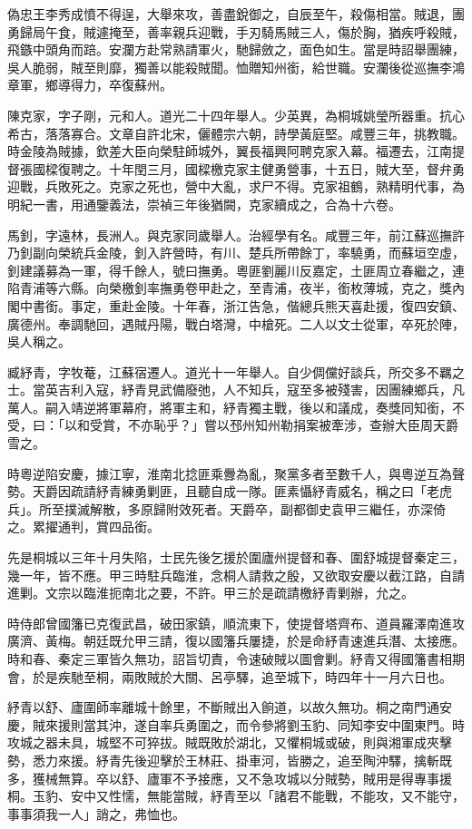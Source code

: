 \begin{pinyinscope}
偽忠王李秀成憤不得逞，大舉來攻，善盡銳御之，自辰至午，殺傷相當。賊退，團勇歸局午食，賊遽掩至，善率親兵迎戰，手刃騎馬賊三人，傷於胸，猶疾呼殺賊，飛鏃中頭角而踣。安瀾方赴常熟請軍火，馳歸斂之，面色如生。當是時詔舉團練，吳人脆弱，賊至則靡，獨善以能殺賊聞。恤贈知州銜，給世職。安瀾後從巡撫李鴻章軍，鄉導得力，卒復蘇州。

陳克家，字子剛，元和人。道光二十四年舉人。少英異，為桐城姚瑩所器重。抗心希古，落落寡合。文章自許北宋，儷體宗六朝，詩學黃庭堅。咸豐三年，挑教職。時金陵為賊據，欽差大臣向榮駐師城外，翼長福興阿聘克家入幕。福遷去，江南提督張國樑復聘之。十年閏三月，國樑檄克家主健勇營事，十五日，賊大至，督弁勇迎戰，兵敗死之。克家之死也，營中大亂，求尸不得。克家祖鶴，熟精明代事，為明紀一書，用通鑒義法，崇禎三年後猶闕，克家續成之，合為十六卷。

馬釗，字遠林，長洲人。與克家同歲舉人。治經學有名。咸豐三年，前江蘇巡撫許乃釗副向榮統兵金陵，釗入許營時，有川、楚兵所帶餘丁，率驍勇，而蘇垣空虛，釗建議募為一軍，得千餘人，號曰撫勇。粵匪劉麗川反嘉定，土匪周立春繼之，連陷青浦等六縣。向榮檄釗率撫勇卷甲赴之，至青浦，夜半，銜枚薄城，克之，獎內閣中書銜。事定，重赴金陵。十年春，浙江告急，偕總兵熊天喜赴援，復四安鎮、廣德州。奉調馳回，遇賊丹陽，戰白塔灣，中槍死。二人以文士從軍，卒死於陣，吳人稱之。

臧紓青，字牧菴，江蘇宿遷人。道光十一年舉人。自少倜儻好談兵，所交多不羈之士。當英吉利入寇，紓青見武備廢弛，人不知兵，寇至多被殘害，因團練鄉兵，凡萬人。嗣入靖逆將軍幕府，將軍主和，紓青獨主戰，後以和議成，奏獎同知銜，不受，曰：「以和受賞，不亦恥乎？」嘗以邳州知州勒捐案被牽涉，查辦大臣周天爵雪之。

時粵逆陷安慶，據江寧，淮南北捻匪乘釁為亂，聚黨多者至數千人，與粵逆互為聲勢。天爵因疏請紓青練勇剿匪，且聽自成一隊。匪素懾紓青威名，稱之曰「老虎兵」。所至撲滅解散，多原歸附效死者。天爵卒，副都御史袁甲三繼任，亦深倚之。累擢通判，賞四品銜。

先是桐城以三年十月失陷，士民先後乞援於圍廬州提督和春、圍舒城提督秦定三，幾一年，皆不應。甲三時駐兵臨淮，念桐人請救之殷，又欲取安慶以截江路，自請進剿。文宗以臨淮扼南北之要，不許。甲三於是疏請檄紓青剿辦，允之。

時侍郎曾國籓已克復武昌，破田家鎮，順流東下，使提督塔齊布、道員羅澤南進攻廣濟、黃梅。朝廷既允甲三請，復以國籓兵屢捷，於是命紓青速進兵潛、太接應。時和春、秦定三軍皆久無功，詔旨切責，令速破賊以圖會剿。紓青又得國籓書相期會，於是疾馳至桐，兩敗賊於大關、呂亭驛，追至城下，時四年十一月六日也。

紓青以舒、廬圍師率離城十餘里，不斷賊出入餉道，以故久無功。桐之南門通安慶，賊來援則當其沖，遂自率兵勇圍之，而令參將劉玉豹、同知李安中圍東門。時攻城之器未具，城堅不可猝拔。賊既敗於湖北，又懼桐城或破，則與湘軍成夾擊勢，悉力來援。紓青先後迎擊於王林莊、掛車河，皆勝之，追至陶沖驛，擒斬既多，獲械無算。卒以舒、廬軍不予接應，又不急攻城以分賊勢，賊用是得專事援桐。玉豹、安中又性懦，無能當賊，紓青至以「諸君不能戰，不能攻，又不能守，事事須我一人」誚之，弗恤也。


\end{pinyinscope}
